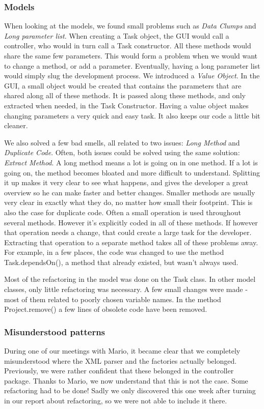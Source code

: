 				\subsubsection{Models}
				When looking at the models, we found small problems such as \emph{Data Clumps}
				and \emph{Long parameter list}.
				When creating a Task object, the GUI would call a controller, who would in turn call a
				Task constructor. All these methods would
				share the same few parameters.
				This would form a problem when we would want to change a method, or add a
				parameter. Eventually, having a long parameter list would simply slug the
				development process.
				We introduced a \emph{Value Object}. In the GUI, a small object would be created that contains the parameters that are shared along all of these methods.
				It is passed along these methods, and only extracted when needed, in the Task
				Constructor.
				Having a value object makes changing parameters a very quick and easy task. It
				also keeps our code a little bit cleaner.
				
				We also solved a few bad smells, all related to two issues: \emph{Long Method} and
				\emph{Duplicate Code}. Often, both issues could be solved using the
				same solution: \emph{Extract Method}.
				A long method means a lot is going on in one method. If a lot is going on, the
				method becomes bloated and more difficult to understand.
				Splitting it up makes it very clear to see what happens, and gives the
				developer a great overview so he can make faster and better changes.
				Smaller methods are usually very clear in exactly what they do, no matter how
				small their footprint.
				This is also the case for duplicate code. Often a small operation is used
				throughout several methods. However it's explicitly coded in all of these
				methods.
				If however that operation needs a change, that could create a large task for the
				developer.
				Extracting that operation to a separate method takes all of these problems away.
				For example, in a few places, the code was changed to use the method Task.dependsOn(), a method that already existed, but wasn't always used.
				
				Most of the refactoring in the model was done on the Task class. In other model classes, only little refactoring was necessary. A few small changes were made - most of them related to poorly chosen variable names. 
				In the method Project.remove() a few lines of obsolete code have been removed.


			\subsubsection{Misunderstood patterns}
			During one of our meetings with Mario, it became clear that we completely misunderstood where the XML parser and the factories actually belonged. Previously, we were rather confident that these belonged in the controller package. Thanks to Mario, we now understand that this is not the case. Some refactoring had to be done! Sadly we only discovered this one week after turning in our report about refactoring, so we were not able to include it there.
			
